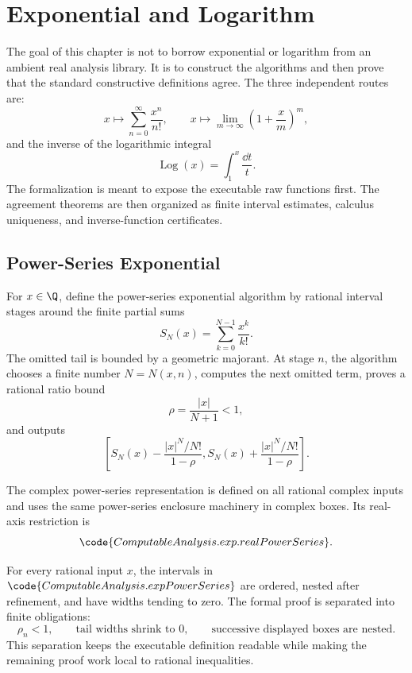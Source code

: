 \chapter{Exponential and Logarithm}

The goal of this chapter is not to borrow exponential or logarithm from an
ambient real analysis library.  It is to construct the algorithms and then
prove that the standard constructive definitions agree.  The three
independent routes are:
\[
  x\longmapsto\sum_{n=0}^{\infty}\frac{x^n}{n!},
  \qquad
  x\longmapsto\lim_{m\to\infty}\left(1+\frac{x}{m}\right)^m,
\]
and the inverse of the logarithmic integral
\[
  \operatorname{Log}(x)=\int_1^x \frac{\dd t}{t}.
\]
The formalization is meant to expose the executable raw functions first.  The
agreement theorems are then organized as finite interval estimates,
calculus uniqueness, and inverse-function certificates.

\section{Power-Series Exponential}

\begin{definition}\label{def:exp-power-series-real}
\leanok
For \(x\in\Q\), define the power-series exponential algorithm by rational
interval stages around the finite partial sums
\[
  S_N(x)=\sum_{k=0}^{N-1}\frac{x^k}{k!}.
\]
The omitted tail is bounded by a geometric majorant.  At stage \(n\), the
algorithm chooses a finite number \(N=N(x,n)\), computes the next omitted
term, proves a rational ratio bound
\[
  \rho=\frac{|x|}{N+1}<1,
\]
and outputs
\[
  \left[
    S_N(x)-\frac{|x|^N/N!}{1-\rho},
    S_N(x)+\frac{|x|^N/N!}{1-\rho}
  \right].
\]
\end{definition}

\begin{definition}\label{def:exp-power-series-function}
\leanok
The complex power-series representation is defined on all rational complex
inputs and uses the same power-series enclosure machinery in complex boxes.
Its real-axis restriction is
\[
  \code{ComputableAnalysis.exp.realPowerSeries}.
\]
\end{definition}

\begin{theorem}\label{thm:exp-power-series-valid}
For every rational input \(x\), the intervals in
\(\code{ComputableAnalysis.expPowerSeries}\) are ordered, nested after
refinement, and have widths tending to zero.  The formal proof is separated
into finite
obligations:
\[
  \rho_n<1,\qquad
  \text{tail widths shrink to }0,\qquad
  \text{successive displayed boxes are nested}.
\]
This separation keeps the executable definition readable while making the
remaining proof work local to rational inequalities.
\end{theorem}


